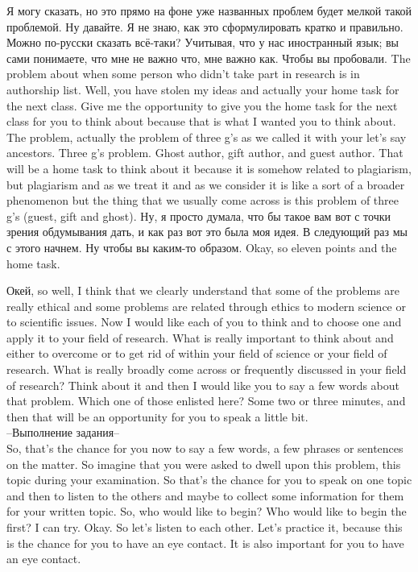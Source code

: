 \documentclass[main.tex]{subfiles}
\begin{document}
Я могу сказать, но это прямо на фоне уже названных проблем будет мелкой такой проблемой.
Ну давайте.
Я не знаю, как это сформулировать кратко и правильно.
Можно по-русски сказать всё-таки?
Учитывая, что у нас иностранный язык; вы сами понимаете, что мне не важно что, мне важно как.
Чтобы вы пробовали.
The problem about when some person who didn't take part in research is in authorship list.
Well, you have stolen my ideas and actually your home task for the next class.
Give me the opportunity to give you the home task for the next class for you to think about because that is what I wanted you to think about.
The problem, actually the problem of three g's as we called it with your let's say ancestors.
Three g's problem.
Ghost author, gift author, and guest author.
That will be a home task to think about it because it is somehow related to plagiarism, but plagiarism and as we treat it and as we consider it is like a sort of a broader phenomenon but the thing that we usually come across is this problem of three g's (guest, gift and ghost).
Ну, я просто думала, что бы такое вам вот с точки зрения обдумывания дать, и как раз вот это была моя идея.
В следующий раз мы с этого начнем.
Ну чтобы вы каким-то образом.
Okay, so eleven points and the home task.

Окей, so well, I think that we clearly understand that some of the problems are really ethical and some problems are related through ethics to modern science or to scientific issues.
Now I would like each of you to think and to choose one and apply it to your field of research.
What is really important to think about and either to overcome or to get rid of within your field of science or your field of research.
What is really broadly come across or frequently discussed in your field of research?
Think about it and then I would like you to say a few words about that problem.
Which one of those enlisted here?
Some two or three minutes, and then that will be an opportunity for you to speak a little bit.
\\

--Выполнение задания--
\\

So, that's the chance for you now to say a few words, a few phrases or sentences on the matter.
So imagine that you were asked to dwell upon this problem, this topic during your examination.
So that's the chance for you to speak on one topic and then to listen to the others and maybe to collect some information for them for your written topic.
So, who would like to begin?
Who would like to begin the first?
I can try.
Okay.
So let's listen to each other.
Let's practice it, because this is the chance for you to have an eye contact.
It is also important for you to have an eye contact.
\end{document}
